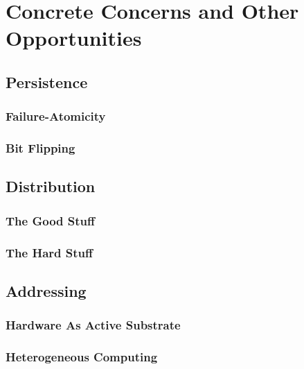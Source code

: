 
\chapter[Concrete Concerns and Other Opportunities]{Concrete Concerns and \linebreak Other Opportunities}\label{ch:concrete}

\section{Persistence}

\subsection{Failure-Atomicity}

\subsection{Bit Flipping}

\section{Distribution}

\subsection{The Good Stuff}

\subsection{The Hard Stuff}

\section{Addressing}

\subsection{Hardware As Active Substrate}

\subsection{Heterogeneous Computing}

